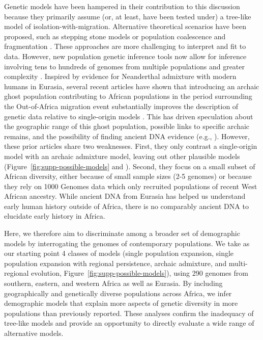 \documentclass{article}
\begin{document}
Genetic models have been hampered in their contribution to this discussion
because they primarily assume (or, at least, have been tested under) a
tree-like model of isolation-with-migration. Alternative theoretical scenarios
have been proposed, such as stepping stone models \citep{Arredondo2021-qa} or
population coalescence and fragmentation \citep{Scerri2019-xg}. These
approaches are more challenging to interpret and fit to data. However, new
population genetic inference tools now allow for inference involving tens to
hundreds of genomes from multiple populations and greater complexity
\citep{Kamm2020-vn,Ragsdale2019-nt,Speidel2019-nj}. Inspired by evidence for
Neanderthal admixture with modern humans in Eurasia, several recent articles
have shown that introducing an archaic ghost population contributing to African
populations in the period surrounding the Out-of-Africa migration event
substantially improves the description of genetic data relative to
single-origin models
\citep{Plagnol2006-lt,Hammer2011-bx,Hsieh2016-gk,Hey2018-pw,Ragsdale2019-nt,Durvasula2020-td,Lorente-Galdos2019-vz,Durvasula2020-td}.
This has driven speculation about the geographic range of this ghost
population, possible links to specific archaic remains, and the possibility of
finding ancient DNA evidence (e.g., \citet{Hsieh2016-gk}). However, these prior
articles share two weaknesses. First, they only contrast a single-origin model
with an archaic admixture model, leaving out other plausible models
(Figure~\ref{fig:supp-possible-models} and \citet{Henn2018-rf}). Second, they
focus on a small subset of African diversity, either because of small sample
sizes (2-5 genomes) or because they rely on 1000 Genomes data which only
recruited populations of recent West African ancestry. While ancient DNA from
Eurasia has helped us understand early human history outside of Africa, there
is no comparably ancient DNA to elucidate early history in Africa.

Here, we therefore aim to discriminate among a broader set of demographic
models by interrogating the genomes of contemporary populations. We take as our
starting point 4 classes of models (single population expansion, single
    population expansion with regional persistence, archaic admixture, and
multi-regional evolution, Figure~\ref{fig:supp-possible-models}), using 290
genomes from southern, eastern, and western Africa as well as Eurasia. By
including geographically and genetically diverse populations across Africa, we
infer demographic models that explain more aspects of genetic diversity in more
populations than previously reported. These analyses confirm the inadequacy of
tree-like models and provide an opportunity to directly evaluate a wide range
of alternative models.
\end{document}

